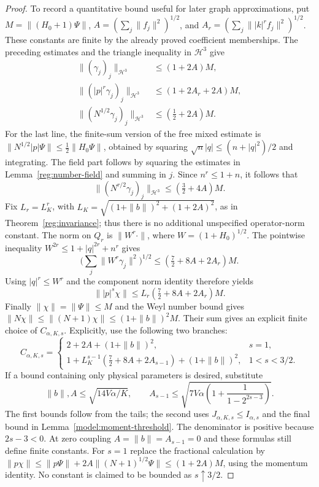 \documentclass[11pt,a4paper]{article}
\theoremstyle{definition}
\theoremstyle{remark}
\begin{document}
\begin{proof}
To record a quantitative bound useful for later graph
approximations, put $M=\|(H_0+1)\Psi\|$,
$A=(\sum_j\|f_j\|^2)^{1/2}$, and
$A_r=(\sum_j\||k|^rf_j\|^2)^{1/2}$. These constants are
finite by the already proved coefficient memberships. The
preceding estimates and the triangle inequality in $\mathcal H^3$
give
\begin{align*}
 \|(\gamma_j)_j\|_{\mathcal H^3}&\leq(1+2A)M,\\
 \|(|p|^r\gamma_j)_j\|_{\mathcal H^3}
       &\leq(1+2A_r+2A)M,\\
 \|(N^{1/2}\gamma_j)_j\|_{\mathcal H^3}
       &\leq(\tfrac12+2A)M.
\end{align*}
For the last line, the finite-sum version of the free mixed
estimate is $\|N^{1/2}|p|\Psi\|\leq\tfrac12\|H_0\Psi\|$,
obtained by squaring $\sqrt n|q|\leq(n+|q|^2)/2$ and
integrating. The field part follows by squaring the estimates
in Lemma~\ref{reg:number-field} and summing in $j$.
Since $n^r\leq1+n$, it follows that
\[
 \|(N^{r/2}\gamma_j)_j\|_{\mathcal H^3}
       \leq(\tfrac32+4A)M.
\]
Fix $L_r=L_K^r$, with
$L_K=\sqrt{(1+\|b\|)^2+(1+2A)^2}$, as in
Theorem~\ref{reg:invariance}; thus there is no additional
unspecified operator-norm constant. The norm on $Q_r$ is
$\|W^r\cdot\|$, where $W=(1+H_0)^{1/2}$.
The pointwise inequality
$W^{2r}\leq1+|q|^{2r}+n^r$ gives
\[
 \Big(\sum_j\|W^r\gamma_j\|^2\Big)^{1/2}
       \leq(\tfrac72+8A+2A_r)M.
\]
Using $|q|^r\leq W^r$ and the component norm identity therefore
yields
\[
 \||p|^s\chi\|\leq
 L_r(\tfrac72+8A+2A_r)M.
\]
Finally $\|\chi\|=\|\Psi\|\leq M$ and the Weyl number
bound gives
$\|N\chi\|\leq\|(N+1)\chi\|
\leq(1+\|b\|)^2M$. Their sum gives an explicit finite
choice of $C_{\alpha,K,s}$. Explicitly, use the following
two branches:
\[
 C_{\alpha,K,s}=
 \begin{cases}
  2+2A+(1+\|b\|)^2,&s=1,\\
  1+L_K^{s-1}(\tfrac72+8A+2A_{s-1})+(1+\|b\|)^2,
       &1<s<3/2.
 \end{cases}
\]
If a bound containing only physical parameters is desired, substitute
\[
 \|b\|,A\leq\sqrt{14V\alpha/K},\qquad
 A_{s-1}\leq
 \sqrt{7V\alpha\left(1+\frac1{1-2^{2s-3}}\right)}.
\]
The first bounds follow from the tails; the second uses
$J_{\alpha,K,s}\leq I_{\alpha,s}$ and the final bound in
Lemma~\ref{model:moment-threshold}. The denominator is positive
because $2s-3<0$. At zero coupling $A=\|b\|=A_{s-1}=0$
and these formulas still define finite constants. For $s=1$
replace the fractional
calculation by
$\|p\chi\|\leq\|p\Psi\|+2A\|(N+1)^{1/2}\Psi\|
\leq(1+2A)M$, using the momentum identity. No constant is
claimed to be bounded as $s\uparrow3/2$.
\end{proof}
\end{document}
